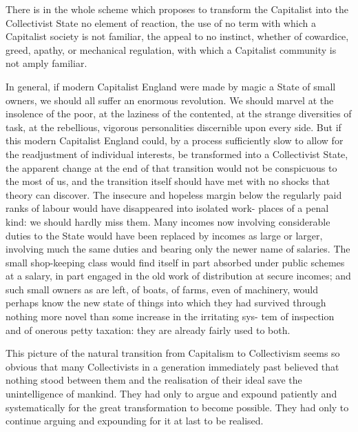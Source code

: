 \documentclass{book}
\begin{document}
There is in the whole scheme which proposes to transform the Capitalist into the Collectivist State no element of reaction, the use of no term with which a Capitalist society is not familiar, the appeal to no instinct, whether of cowardice, greed, apathy, or mechanical regulation, with which a Capitalist community is not amply familiar.

In general, if modern Capitalist England were made by magic a State of small owners, we should all suffer an enormous revolution. We should marvel at the insolence of the poor, at the laziness of the contented, at the strange diversities of task, at the rebellious, vigorous personalities discernible upon every side. But if this modern Capitalist England could, by a process sufficiently slow to allow for the readjustment of individual interests, be transformed into a Collectivist State, the apparent change at the end of that transition would not be conspicuous to the most of us, and the transition itself should have met with no shocks that theory can discover. The insecure and hopeless margin below the regularly paid ranks of labour would have disappeared into isolated work- places of a penal kind: we should hardly miss them. Many incomes now involving considerable duties to the State would have been replaced by incomes as large or larger, involving much the same duties and bearing only the newer name of salaries. The small shop-keeping class would find itself in part absorbed under public schemes at a salary, in part engaged in the old work of distribution at secure incomes; and such small owners as are left, of boats, of farms, even of machinery, would perhaps know the new state of things into which they had survived through nothing more novel than some increase in the irritating sys- tem of inspection and of onerous petty taxation: they are already fairly used to both.

This picture of the natural transition from Capitalism to Collectivism seems so obvious that many Collectivists in a generation immediately past believed that nothing stood between them and the realisation of their ideal save the unintelligence of mankind. They had only to argue and expound patiently and systematically for the great transformation to become possible. They had only to continue arguing and expounding for it at last to be realised.
\end{document}
